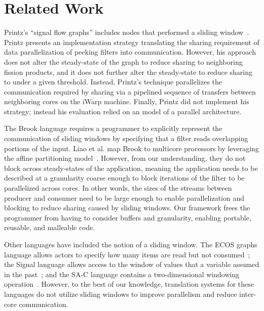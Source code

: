 \vspace{-5pt}
\section{Related Work}

Printz's ``signal flow graphs'' includes nodes that performed a
sliding window~\cite{printz91thesis}.  Printz presents an
implementation strategy translating the sharing requirement of data
parallelization of peeking filters into communication.  However, his
approach does not alter the steady-state of the graph to reduce
sharing to neighboring fission products, and it does not further alter
the steady-state to reduce sharing to under a given threshold.
Instead, Printz's technique parallelizes the communication required by
sharing via a pipelined sequence of transfers between neighboring
cores on the iWarp machine.  Finally, Printz did not implement his
strategy; instead his evaluation relied on an model of a parallel
architecture.


The Brook language requires a programmer to explicitly represent the
communication of sliding windows by specifying that a filter reads
overlapping portions of the input. Liao et al. map Brook to multicore
processors by leveraging the affine partitioning
model~\cite{liao06brook}. However, from our understanding, they do not
block across steady-states of the application, meaning the application
needs to be described at a granularity coarse enough to block
iterations of the filter to be parallelized across cores. In other
words, the sizes of the streams between producer and consumer need to
be large enough to enable parallelization and blocking to reduce
sharing caused by sliding windows.  Our framework frees the programmer
from having to consider buffers and granularity, enabling portable,
reusable, and malleable code.

Other languages have included the notion of a sliding window.  The ECOS
graphs language allows actors to specify how many items are read but
not consumed~\cite{huang_ecos_1992}; the Signal language allows access
to the window of values that a variable assumed in the
past~\cite{le_guernic_signal--data_1986}; and the SA-C language
contains a two-dimensional windowing
operation~\cite{draper_compiling_2001}.  However, to the best of our
knowledge, translation systems for these languages do not utilize
sliding windows to improve parallelism and reduce inter-core
communication.

